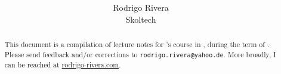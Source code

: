 \documentclass[12pt]{article}
\title{%
\textbf{\coursenum \coursetitle}
}
\author{
Rodrigo Rivera \\
Skoltech
}
\begin{document}
\maketitle
\bigskip

\begin{abstract}
This document is a compilation of lecture notes for \instructor's
\coursenum course in \coursetitle, during the term of \term. Please
send feedback and/or corrections to \texttt{rodrigo.rivera@yahoo.de}.
More broadly, I can be reached at \url{rodrigo-rivera.com}.
\end{abstract}


\clearpage
\glsresetall{}
\tableofcontents
\clearpage
















\clearpage




\clearpage
\appendix

%
\end{document}

